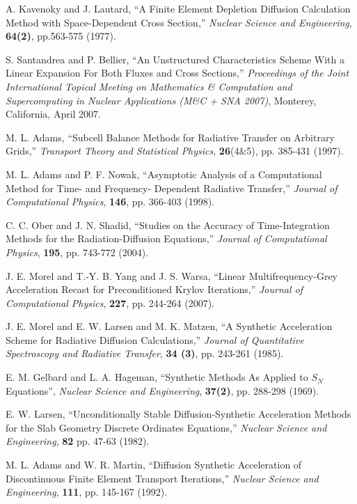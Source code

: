 \documentclass[final,3p,times]{elsarticle}
\begin{document}
\begin{thebibliography}{300}
 A. Kavenoky and J. Lautard, ``A Finite Element Depletion Diffusion Calculation Method with Space-Dependent Cross Section,'' {\it Nuclear Science and Engineering}, {\bf 64(2)}, pp.563-575 (1977).

 S. Santandrea and P. Bellier, ``An Unstructured Characteristics Scheme With a Linear Expansion For Both Fluxes and Cross Sections,'' {\it Proceedings of the Joint International Topical Meeting on Mathematics \& Computation and Supercomputing in Nuclear Applications (M\&C + SNA 2007)}, Monterey, California, April 2007.

 M. L. Adams, ``Subcell Balance Methods for Radiative Transfer on Arbitrary Grids,'' {\it Transport Theory and Statistical Physics}, {\bf 26}(4\&5), pp. 385-431 (1997).

 M. L. Adams and P. F. Nowak, ``Asymptotic Analysis of a Computational Method for Time- and Frequency- Dependent Radiative Transfer,'' {\it Journal of Computational Physics}, {\bf 146}, pp. 366-403 (1998).

 C. C. Ober and J. N. Shadid, ``Studies on the Accuracy of Time-Integration Methods for the Radiation-Diffusion Equations,'' {\it Journal of Computational Physics}, {\bf 195}, pp. 743-772 (2004).

 J. E. Morel and T.-Y. B. Yang and J. S. Warsa, ``Linear Multifrequency-Grey Acceleration Recast for Preconditioned Krylov Iterations,'' {\it Journal of Computational Physics}, {\bf 227}, pp. 244-264 (2007).

 J. E. Morel and E. W. Larsen and M. K. Matzen, ``A Synthetic Acceleration Scheme for Radiative Diffusion Calculations,'' {\em Journal of Quantitative Spectroscopy and Radiative Transfer}, {\bf 34 (3)}, pp. 243-261 (1985).

 E. M. Gelbard and L. A. Hageman, ``Synthetic Methods As Applied to $S_N$ Equations'', {\em Nuclear Science and Engineering}, {\bf 37(2)}, pp. 288-298 (1969).

 E. W. Larsen, ``Unconditionally Stable Diffusion-Synthetic Acceleration Methods for the Slab Geometry Discrete Ordinates Equations,'' {\it Nuclear Science and Engineering}, {\bf 82} pp. 47-63 (1982).

 M. L. Adams and W. R. Martin, ``Diffusion Synthetic Acceleration of Discontinuous Finite Element Transport Iterations,'' {\em Nuclear Science and Engineering}, {\bf 111}, pp. 145-167 (1992).


\end{thebibliography}
\end{document}
